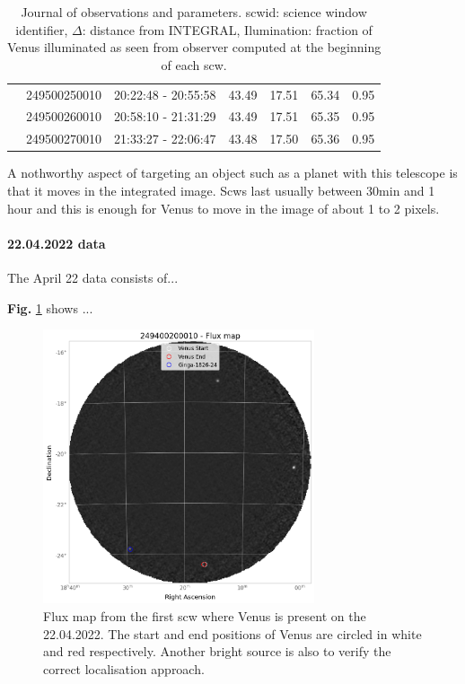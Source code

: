 \begin{table}[H]
\begin{tabular}{@{}ccccccc@{}}
         & 249500250010 & 20:22:48 - 20:55:58 & 43.49 & 17.51 & 65.34 & 0.95 \\
         & 249500260010 & 20:58:10 - 21:31:29 & 43.49 & 17.51 & 65.35 & 0.95 \\
         & 249500270010 & 21:33:27 - 22:06:47 & 43.48 & 17.50 & 65.36 & 0.95 \\ \midrule 
        \end{tabular}
        \caption{Journal of observations and parameters.
        scw\textunderscore id: science window identifier, $\Delta$: distance from INTEGRAL, Ilumination: fraction of Venus illuminated as seen from observer computed at the beginning of each scw.}
        \label{journal}
        \end{table}



    A nothworthy aspect of targeting an object such as a planet with this telescope is that it moves in the integrated image. Scws last usually between 30min and 1 hour and 
    this is enough for Venus to move in the image of about 1 to 2 pixels.
    
    \paragraph{22.04.2022 data}

    The April 22 data consists of...
    
    \textbf{Fig.} \ref{22_map_single} shows ...
    

        \begin{figure}[H]
        \centering
        \includegraphics[width = 8cm]{report/Figures/methods/2204/20_map.png}
        \caption{Flux map from the first scw where Venus is present on the 22.04.2022. The start and end positions of Venus are circled in white and red respectively. Another bright source is also to verify the correct localisation approach.}
        \label{22_map_single}
        \end{figure}

